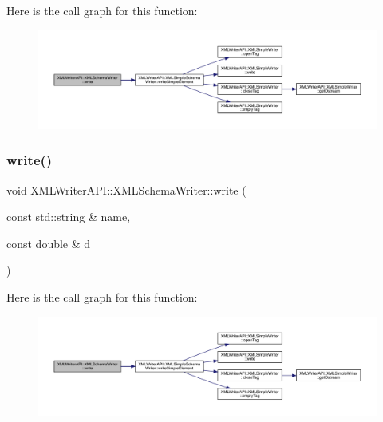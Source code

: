 Here is the call graph for this function\+:
\nopagebreak
\begin{figure}[H]
\begin{center}
\leavevmode
\includegraphics[width=350pt]{db/d34/classXMLWriterAPI_1_1XMLSchemaWriter_affbcfbac63240a8048b6b0940cc05c30_cgraph}
\end{center}
\end{figure}
\mbox{\label{classXMLWriterAPI_1_1XMLSchemaWriter_aaa0138613c826e77a63e5195bc742f07}} 
\subsubsection{\texorpdfstring{write()}{write()}\hspace{0.1cm}{\footnotesize\ttfamily [10/15]}}
{\footnotesize\ttfamily void X\+M\+L\+Writer\+A\+P\+I\+::\+X\+M\+L\+Schema\+Writer\+::write (\begin{DoxyParamCaption}\item[{const std\+::string \&}]{name,  }\item[{const double \&}]{d }\end{DoxyParamCaption})\hspace{0.3cm}{\ttfamily [inline]}}

Here is the call graph for this function\+:
\nopagebreak
\begin{figure}[H]
\begin{center}
\leavevmode
\includegraphics[width=350pt]{db/d34/classXMLWriterAPI_1_1XMLSchemaWriter_aaa0138613c826e77a63e5195bc742f07_cgraph}
\end{center}
\end{figure}
\mbox{\label{classXMLWriterAPI_1_1XMLSchemaWriter_aaa0138613c826e77a63e5195bc742f07}} 
